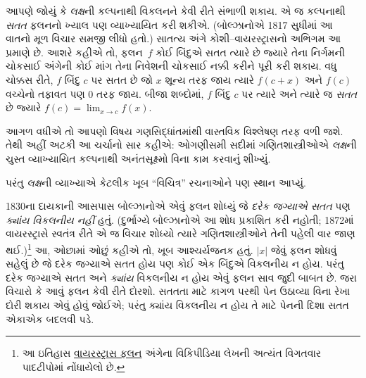 આપણે જોયું કે \emph{લક્ષ}ની કલ્પનાથી
વિકલનને કેવી રીતે સંભાળી શકાય.
એ જ કલ્પનાથી \emph{સતત} ફલનનો
ખ્યાલ પણ વ્યાખ્યાયિત કરી શકીએ.
(બોલ્ઝાનોએ 1817 સુધીમાં આ વાતનો
મૂળ વિચાર સમજી લીધો હતો.)
સાતત્ય અંગે કોશી--વાયરસ્ટ્રાસનો
અભિગમ આ પ્રમાણે છે. આશરે કહીએ તો,
ફલન~$f$ કોઈ બિંદુએ સતત ત્યારે છે
જ્યારે તેના નિર્ગમની ચોકસાઈ અંગેની
કોઈ માંગ તેના નિવેશની ચોકસાઈ
નક્કી કરીને પૂરી કરી શકાય.
વધુ ચોક્કસ રીતે, $f$ બિંદુ $c$
પર સતત છે જો $x$ શૂન્ય તરફ
જાય ત્યારે $f(c + x)$ અને $f(c)$
વચ્ચેનો તફાવત પણ $0$ તરફ જાય.
બીજા શબ્દોમાં, $f$ બિંદુ $c$
પર ત્યારે અને ત્યારે જ
\emph{સતત} છે જ્યારે
$f(c) = \lim_{x \rightarrow c} f(x)$.

આગળ વધીએ તો આપણો વિષય ગણસિદ્ધાંતમાંથી
વાસ્તવિક વિશ્લેષણ તરફ વળી જશે. તેથી
અહીં અટકી આ ચર્ચાનો સાર કહીએ:
ઓગણીસમી સદીમાં ગણિતશાસ્ત્રીઓએ
\emph{લક્ષ}ની ચુસ્ત વ્યાખ્યાયિત કલ્પનાથી
અનંતસૂક્ષ્મો વિના કામ કરવાનું શીખ્યું.
\endgroup

\begingroup
\makeatletter{}\makeatother

\label{guunit:OLP-0636}


પરંતુ \emph{લક્ષ}ની વ્યાખ્યાએ કેટલીક ખૂબ
“વિચિત્ર” રચનાઓને પણ સ્થાન આપ્યું.

1830ના દાયકાની આસપાસ બોલ્ઝાનોએ એવું
ફલન શોધ્યું જે \emph{દરેક જગ્યાએ સતત}
પણ \emph{ક્યાંય વિકલનીય નહીં} હતું.
(દુર્ભાગ્યે બોલ્ઝાનોએ આ શોધ પ્રકાશિત
કરી નહોતી; 1872માં વાયરસ્ટ્રાસે સ્વતંત્ર
રીતે એ જ વિચાર શોધ્યો ત્યારે ગણિતશાસ્ત્રીઓને
તેની પહેલી વાર જાણ થઈ.)\footnote{આ ઇતિહાસ
\href{http://en.wikipedia.org/wiki/Weierstrass_function}{વાયરસ્ટ્રાસ
ફલન} અંગેના વિકિપીડિયા લેખની અત્યંત
વિગતવાર પાદટીપોમાં નોંધાયેલો છે.}
આ, ઓછામાં ઓછું કહીએ તો, ખૂબ આશ્ચર્યજનક
હતું. $|x|$ જેવું ફલન શોધવું સહેલું છે
જે દરેક જગ્યાએ સતત હોય પણ કોઈ એક
બિંદુએ વિકલનીય ન હોય. પરંતુ દરેક
જગ્યાએ સતત અને \emph{ક્યાંય}
વિકલનીય ન હોય એવું ફલન સાવ
જુદી બાબત છે. જરા વિચારો કે
આવું ફલન કેવી રીતે દોરશો.
સતતતા માટે કાગળ પરથી પેન
ઉઠાવ્યા વિના રેખા દોરી શકાય
એવું હોવું જોઈએ; પરંતુ ક્યાંય
વિકલનીય ન હોય તે માટે પેનની
દિશા સતત એકાએક બદલવી પડે.

